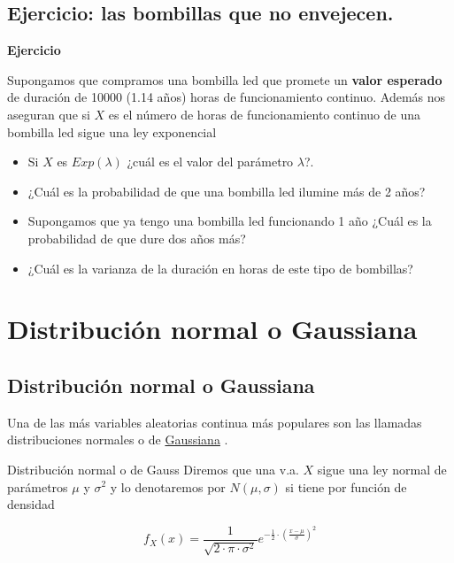 \documentclass[]{book}
\providecommand{\tightlist}{%
  \setlength{\itemsep}{0pt}\setlength{\parskip}{0pt}}
\begin{document}
\hypertarget{ejercicio-las-bombillas-que-no-envejecen.}{%
\subsection{Ejercicio: las bombillas que no envejecen.}\label{ejercicio-las-bombillas-que-no-envejecen.}}

\textbf{Ejercicio}

Supongamos que compramos una bombilla led que promete un \textbf{valor esperado} de duración de 10000 (1.14 años) horas de funcionamiento continuo. Además nos aseguran que si \(X\) es el número de horas de funcionamiento continuo de una bombilla led sigue una ley exponencial

\begin{itemize}
\tightlist
\item
  Si \(X\) es \(Exp(\lambda)\) ¿cuál es el valor del parámetro \(\lambda\)?.
\item
  ¿Cuál es la probabilidad de que una bombilla led ilumine más de 2 años?
\item
  Supongamos que ya tengo una bombilla led funcionando 1 año ¿Cuál es la probabilidad de que dure dos años más?
\item
  ¿Cuál es la varianza de la duración en horas de este tipo de bombillas?
\end{itemize}

\hypertarget{distribuciuxf3n-normal-o-gaussiana}{%
\section{Distribución normal o Gaussiana}\label{distribuciuxf3n-normal-o-gaussiana}}

\hypertarget{distribuciuxf3n-normal-o-gaussiana-1}{%
\subsection{Distribución normal o Gaussiana}\label{distribuciuxf3n-normal-o-gaussiana-1}}

Una de las más variables aleatorias continua más populares son las llamadas distribuciones normales o de \href{https://es.wikipedia.org/wiki/Distribuci\%C3\%B3n_normal}{Gaussiana} .

 Distribución normal o de Gauss
Diremos que una v.a. \(X\) sigue una ley normal de parámetros
\(\mu\) y \(\sigma^2\) y lo denotaremos por \(N(\mu,\sigma)\)
si tiene por función de densidad

\[
f_{X}(x)=\frac1{\sqrt{2\cdot\pi\cdot\sigma^2}}
e^{-\frac{1}{2}\cdot\left(\frac{x-\mu}{\sigma}\right)^2}
\]
\end{document}
